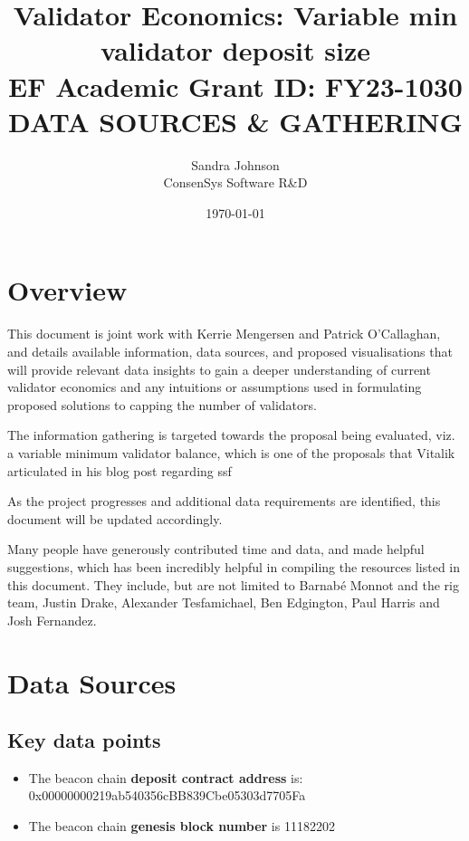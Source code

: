 \documentclass[UTF8]{article}
\title{Validator Economics: Variable min validator deposit size\\
\vspace{4pt}
\large EF Academic Grant ID: FY23-1030\\
\vspace{16pt}
DATA SOURCES \& GATHERING}
\author{Sandra Johnson\\
ConsenSys Software R\&D}
\date{\today}                                           %
\begin{document}
\maketitle



\section{Overview}
This document is joint work with Kerrie Mengersen and Patrick O'Callaghan, and details available information, data sources, and proposed visualisations that will provide relevant data insights to gain a deeper understanding of current validator economics and any intuitions or assumptions used in formulating proposed solutions to capping the number of validators. 

The information gathering is targeted towards the proposal being evaluated, viz. a variable minimum validator balance, which is one of the proposals that Vitalik articulated in his blog post regarding \gls{ssf} 

As the project progresses and additional data requirements are identified, this document will be updated accordingly.

Many people have generously contributed time and data, and made helpful suggestions, which has been incredibly helpful in compiling the resources listed in this document. They include, but are not limited to Barnabé Monnot and the \gls{rig} team, Justin Drake, Alexander Tesfamichael, Ben Edgington, Paul Harris and Josh Fernandez.

\section{Data Sources}
\label{sec:sources}
\subsection{Key data points}
\begin{itemize}
\item The beacon chain \textbf{deposit contract address} is: 0x00000000219ab540356cBB839Cbe05303d7705Fa 
\item The beacon chain \textbf{genesis block number} is 11182202
\end{itemize}
\end{document}
